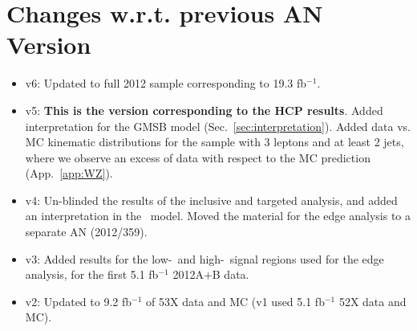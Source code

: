 \section{Changes w.r.t. previous AN Version}
\label{sec:changes}

\begin{itemize}

\item v6: Updated to full 2012 sample corresponding to 19.3 fb$^{-1}$.
\item v5: {\bf This is the version corresponding to the HCP results}. Added interpretation for the GMSB model (Sec.~\ref{sec:interpretation}). Added data vs. MC kinematic distributions for the sample with 3 leptons and at least 2 jets, where we observe an excess of data with respect to the MC prediction (App.~\ref{app:WZ}).
\item v4: Un-blinded the results of the inclusive and targeted analysis, and added an interpretation in the \wzmet\ model. Moved the material for the edge analysis to a separate AN (2012/359).
\item v3: Added results for the low-\MET\ and high-\MET\ signal regions used for the edge analysis, for the first 5.1 fb$^{-1}$ 2012A+B data.
\item v2: Updated to 9.2 fb$^{-1}$ of 53X data and MC (v1 used 5.1 fb$^{-1}$ 52X data and MC).

\end{itemize}
